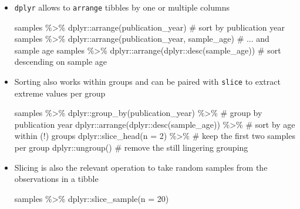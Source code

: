 \documentclass[
  letterpaper,
]{book}
\newenvironment{Shaded}{}{}
\newcommand{\AttributeTok}[1]{\textcolor[rgb]{0.84,0.23,0.29}{#1}}
\newcommand{\CommentTok}[1]{\textcolor[rgb]{0.42,0.45,0.49}{#1}}
\newcommand{\DecValTok}[1]{\textcolor[rgb]{0.00,0.36,0.77}{#1}}
\newcommand{\FunctionTok}[1]{\textcolor[rgb]{0.44,0.26,0.76}{#1}}
\newcommand{\NormalTok}[1]{\textcolor[rgb]{0.14,0.16,0.18}{#1}}
\newcommand{\SpecialCharTok}[1]{\textcolor[rgb]{0.00,0.36,0.77}{#1}}
\begin{document}
\begin{itemize}
\item
  \texttt{dplyr} allows to \texttt{arrange} tibbles by one or multiple
  columns

\begin{Shaded}
\begin{Highlighting}[]
\NormalTok{samples }\SpecialCharTok{\%\textgreater{}\%}\NormalTok{ dplyr}\SpecialCharTok{::}\FunctionTok{arrange}\NormalTok{(publication\_year)        }\CommentTok{\# sort by publication year}
\NormalTok{samples }\SpecialCharTok{\%\textgreater{}\%}\NormalTok{ dplyr}\SpecialCharTok{::}\FunctionTok{arrange}\NormalTok{(publication\_year,}
\NormalTok{                        sample\_age)              }\CommentTok{\# ... and sample age}
\NormalTok{samples }\SpecialCharTok{\%\textgreater{}\%}\NormalTok{ dplyr}\SpecialCharTok{::}\FunctionTok{arrange}\NormalTok{(dplyr}\SpecialCharTok{::}\FunctionTok{desc}\NormalTok{(sample\_age)) }\CommentTok{\# sort descending on sample age}
\end{Highlighting}
\end{Shaded}
\item
  Sorting also works within groups and can be paired with \texttt{slice}
  to extract extreme values per group

\begin{Shaded}
\begin{Highlighting}[]
\NormalTok{samples }\SpecialCharTok{\%\textgreater{}\%}
\NormalTok{dplyr}\SpecialCharTok{::}\FunctionTok{group\_by}\NormalTok{(publication\_year) }\SpecialCharTok{\%\textgreater{}\%}       \CommentTok{\# group by publication year}
\NormalTok{dplyr}\SpecialCharTok{::}\FunctionTok{arrange}\NormalTok{(dplyr}\SpecialCharTok{::}\FunctionTok{desc}\NormalTok{(sample\_age)) }\SpecialCharTok{\%\textgreater{}\%} \CommentTok{\# sort by age within (!) groups}
\NormalTok{dplyr}\SpecialCharTok{::}\FunctionTok{slice\_head}\NormalTok{(}\AttributeTok{n =} \DecValTok{2}\NormalTok{) }\SpecialCharTok{\%\textgreater{}\%}                \CommentTok{\# keep the first two samples per group}
\NormalTok{dplyr}\SpecialCharTok{::}\FunctionTok{ungroup}\NormalTok{()                            }\CommentTok{\# remove the still lingering grouping}
\end{Highlighting}
\end{Shaded}
\item
  Slicing is also the relevant operation to take random samples from the
  observations in a tibble

\begin{Shaded}
\begin{Highlighting}[]
\NormalTok{samples }\SpecialCharTok{\%\textgreater{}\%}\NormalTok{ dplyr}\SpecialCharTok{::}\FunctionTok{slice\_sample}\NormalTok{(}\AttributeTok{n =} \DecValTok{20}\NormalTok{)}
\end{Highlighting}
\end{Shaded}
\end{itemize}
\end{document}
